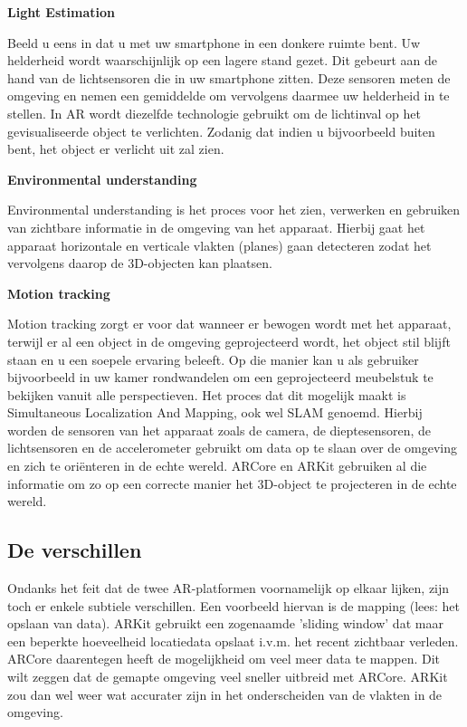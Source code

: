 \textbf{Light Estimation}

Beeld u eens in dat u met uw smartphone in een donkere ruimte bent. Uw helderheid wordt waarschijnlijk op een lagere stand gezet. Dit gebeurt aan de hand van de lichtsensoren die in uw smartphone zitten. Deze sensoren meten de omgeving en nemen een gemiddelde om vervolgens daarmee uw helderheid in te stellen. In AR wordt diezelfde technologie gebruikt om de lichtinval op het gevisualiseerde object te verlichten. Zodanig dat indien u bijvoorbeeld buiten bent, het object er verlicht uit zal zien.

\textbf{Environmental understanding}

Environmental understanding is het proces voor het zien, verwerken en gebruiken van zichtbare informatie in de omgeving van het apparaat. Hierbij gaat het apparaat horizontale en verticale vlakten (planes) gaan detecteren zodat het vervolgens daarop de 3D-objecten kan plaatsen.

\textbf{Motion tracking}

Motion tracking zorgt er voor dat wanneer er bewogen wordt met het apparaat, terwijl er al een object in de omgeving geprojecteerd wordt, het object stil blijft staan en u een soepele ervaring beleeft. Op die manier kan u als gebruiker bijvoorbeeld in uw kamer rondwandelen om een geprojecteerd meubelstuk te bekijken vanuit alle perspectieven. Het proces dat dit mogelijk maakt is Simultaneous Localization And Mapping, ook wel SLAM genoemd. Hierbij worden de sensoren van het apparaat zoals de camera, de dieptesensoren, de lichtsensoren en de accelerometer gebruikt om data op te slaan over de omgeving en zich te oriënteren in de echte wereld. ARCore en ARKit gebruiken al die informatie om zo op een correcte manier het 3D-object te projecteren in de echte wereld. 

\subsection{De verschillen}

Ondanks het feit dat de twee AR-platformen voornamelijk op elkaar lijken, zijn toch er enkele subtiele verschillen. Een voorbeeld hiervan is de mapping (lees: het opslaan van data). ARKit gebruikt een zogenaamde 'sliding window' dat maar een beperkte hoeveelheid locatiedata opslaat i.v.m. het recent zichtbaar verleden. ARCore daarentegen heeft de mogelijkheid om veel meer data te mappen. Dit wilt zeggen dat de gemapte omgeving veel sneller uitbreid met ARCore. ARKit zou dan wel weer wat accurater zijn in het onderscheiden van de vlakten in de omgeving. 


